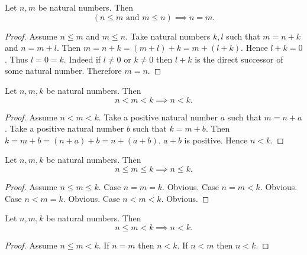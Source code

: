 \documentclass[10pt]{article}
\begin{document}
  \begin{forthel}
    \begin{proposition}
      Let $n, m$ be natural numbers.
      Then \[ (\text{$n \leq m$ and $m \leq n$}) \implies n = m. \]
    \end{proposition}
    \begin{proof}
      Assume $n \leq m$ and $m \leq n$.
      Take natural numbers $k, l$ such that $m = n + k$ and $n = m + l$.
      Then $m
        = n + k
        = (m + l) + k
        = m + (l + k)$.
      Hence $l + k = 0$.
      Thus $l = 0 = k$.
      Indeed if $l \neq 0$ or $k \neq 0$ then $l + k$ is the direct successor of
      some natural number.
      Therefore $m = n$.
    \end{proof}
  \end{forthel}

  \begin{forthel}
    \begin{proposition}
      Let $n, m, k$ be natural numbers.
      Then \[ n < m < k \implies n < k. \]
    \end{proposition}
    \begin{proof}
      Assume $n < m < k$.
      Take a positive natural number $a$ such that $m = n + a$.
      Take a positive natural number $b$ such that $k = m + b$.
      Then $k
        = m + b
        = (n + a) + b
        = n + (a + b)$.
      $a + b$ is positive.
      Hence $n < k$.
    \end{proof}
  \end{forthel}

  \begin{forthel}
    \begin{proposition}
      Let $n, m, k$ be natural numbers.
      Then \[ n \leq m \leq k \implies n \leq k. \]
    \end{proposition}
    \begin{proof}
      Assume $n \leq m \leq k$.
      Case $n = m = k$. Obvious.
      Case $n = m < k$. Obvious.
      Case $n < m = k$. Obvious.
      Case $n < m < k$. Obvious.
    \end{proof}
  \end{forthel}

  \begin{forthel}
    \begin{proposition}
      Let $n, m, k$ be natural numbers.
      Then \[ n \leq m < k \implies n < k. \]
    \end{proposition}
    \begin{proof}
      Assume $n \leq m < k$.
      If $n = m$ then $n < k$.
      If $n < m$ then $n < k$.
    \end{proof}
  \end{forthel}
\end{document}
